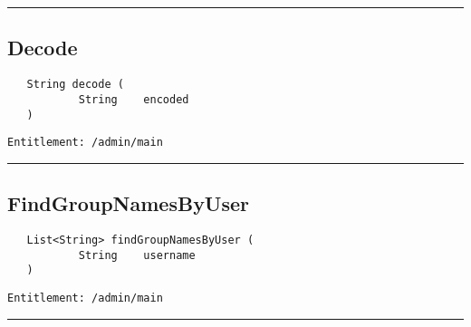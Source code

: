 \rule{12cm}{2pt}
\subsection{Decode}
\label{Api:Decode}
\begin{Verbatim}
   String decode (
           String    encoded
   )
\end{Verbatim}
\begin{Verbatim}[formatcom=\color{Maroon}]
  Entitlement: /admin/main
\end{Verbatim}



\rule{12cm}{2pt}
\subsection{FindGroupNamesByUser}
\label{Api:FindGroupNamesByUser}
\begin{Verbatim}
   List<String> findGroupNamesByUser (
           String    username
   )
\end{Verbatim}
\begin{Verbatim}[formatcom=\color{Maroon}]
  Entitlement: /admin/main
\end{Verbatim}



\rule{12cm}{2pt}
